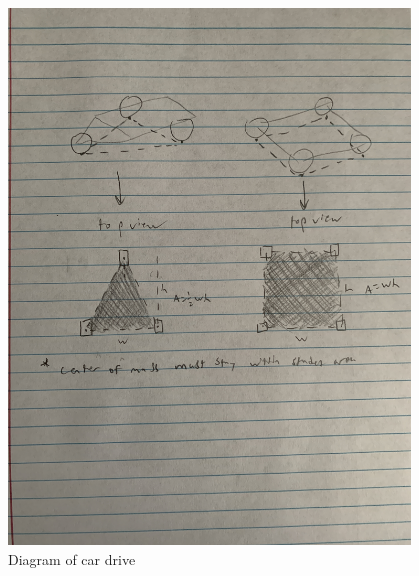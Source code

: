 \begin{figure}[ht]
\centering
\begin{minipage}[b]{.48\textwidth}
  \centering
  \includegraphics[width=0.95\textwidth]{Meetings/September/09-24-22/9-24-22_Hardware_Figure1.JPG}
  \caption{Diagram of car drive}
  \label{fig:pic1}
\end{minipage}%
\hfill%
\begin{minipage}[b]{.48\textwidth}
  \centering

\end{minipage}
\end{figure}
